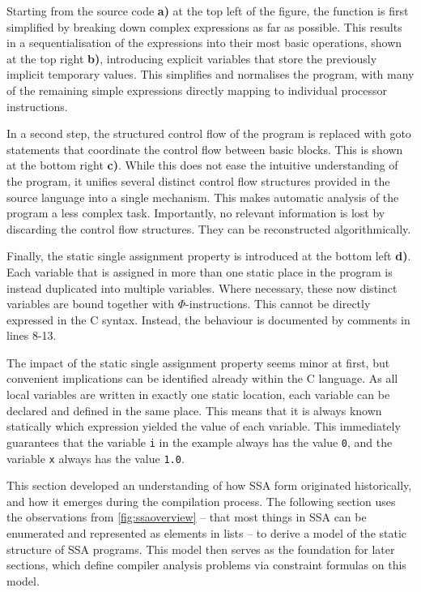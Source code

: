     Starting from the source code {\bf a)} at the top left of the figure, the
    function is first simplified by breaking down complex expressions as far as
    possible.
    This results in a sequentialisation of the expressions into their
    most basic operations, shown at the top right {\bf b)}, introducing
    explicit variables that store the previously implicit temporary values.
    This simplifies and normalises the program, with many of the remaining
    simple expressions directly mapping to individual processor instructions.

    In a second step, the structured control flow of the program is replaced
    with goto statements that coordinate the control flow between basic blocks.
    This is shown at the bottom right {\bf c)}.
    While this does not ease the intuitive understanding of the program, it
    unifies several distinct control flow structures provided in the source
    language into a single mechanism.
    This makes automatic analysis of the program a less complex task.
    Importantly, no relevant information is lost by discarding the control flow
    structures.
    They can be reconstructed algorithmically.

    Finally, the static single assignment property is introduced at the bottom
    left {\bf d)}.
    Each variable that is assigned in more than one static place in the program
    is instead duplicated into multiple variables.
    Where necessary, these now distinct variables are bound together with
    $\Phi$-instructions.
    This cannot be directly expressed in the C syntax.
    Instead, the behaviour is documented by comments in lines 8-13.

    The impact of the static single assignment property seems minor
    at first, but convenient implications can be identified already within the
    C language.
    As all local variables are written in exactly one static location, each
    variable can be declared and defined in the same place.
    This means that it is always known statically which expression yielded the
    value of each variable.
    This immediately guarantees that the variable \texttt{i} in the example
    always has the value \texttt{0}, and the variable \texttt{x} always has the
    value \texttt{1.0}.

    This section developed an understanding of how SSA form originated
    historically, and how it emerges during the compilation process.
    The following section uses the observations from
    \autoref{fig:ssaoverview} -- that most things in SSA can be enumerated and
    represented as elements in lists -- to derive a model of the static
    structure of SSA programs.
    This model then serves as the foundation for later sections, which define
    compiler analysis problems via constraint formulas on this model.


